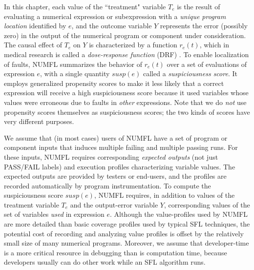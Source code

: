 In this chapter, each value of the ``treatment" variable $T_e$ is the result of evaluating a numerical expression or subexpression with a {\it unique program location} identified by $e$,   and the outcome variable $Y$ represents the error (possibly zero) in the output of the numerical program or component under consideration.  The causal effect of $T_e$ on $Y$ is characterized by a function $r_e (t)$, which in medical research is called a {\it dose-response function} (DRF) \cite{Hirano2004}.  To enable localization of faults, NUMFL summarizes the behavior of $r_e (t)$ over a set of evaluations of expression $e$, with a single quantity $susp(e)$ called a {\it suspiciousness score}. It employs generalized propensity scores to make it less likely that a correct expression will receive a high suspiciousness score because it used variables whose values were erroneous due to faults in {\it other} expressions. Note that we do {\it not} use propensity scores themselves as suspiciousness scores; the two kinds of scores have very different purposes.

We assume that (in most cases) users of NUMFL have a set of program or component inputs that induces multiple failing and multiple passing runs.  For these inputs, NUMFL requires corresponding {\it expected outputs} (not just PASS/FAIL labels) and execution profiles characterizing variable values.  The expected outputs are provided by testers or end-users, and the profiles are recorded automatically by program instrumentation.  To compute the suspiciousness score $susp(e)$,  NUMFL requires, in addition to values of the treatment variable $T_e$ and the output-error variable $Y$, corresponding values of the set of variables {\it used} in expression $e$.  Although the value-profiles used by NUMFL are more detailed than basic coverage profiles used by typical SFL techniques, the potential cost of recording and analyzing value profiles is offset by the relatively small size of many numerical programs.   Moreover, we assume that developer-time is a more critical resource in debugging than is computation time, because developers usually can do other work while an SFL algorithm runs.

